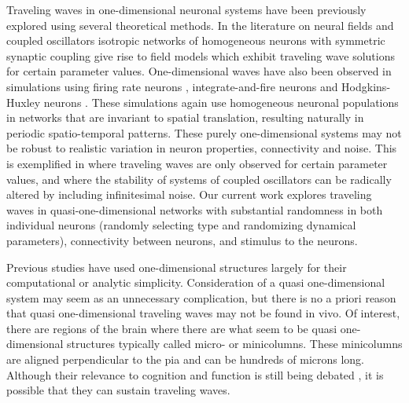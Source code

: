 \documentclass[12pt]{article}
\begin{document}
\color{red}
Traveling waves in one-dimensional neuronal systems have been previously explored using several theoretical methods.
In the literature on neural fields \parencite{Ermentrout1979}\parencite{Folias2012} and coupled oscillators \parencite{Kopell1986}\parencite{Williams1997} isotropic networks of homogeneous neurons with symmetric synaptic coupling give rise to field models which exhibit traveling wave solutions for certain parameter values. 
One-dimensional waves have also been observed in simulations using firing rate neurons \parencite{Senk2020}\parencite{Roxin2005}, integrate-and-fire neurons \parencite{Bressloff1997}\parencite{Golomb1999} and Hodgkins-Huxley neurons \parencite{Golomb1997}.
These simulations again use homogeneous neuronal populations in networks that are invariant to spatial translation, resulting naturally in periodic spatio-temporal patterns.
These purely one-dimensional systems may not be robust to realistic variation in neuron properties, connectivity and noise.
This is exemplified in \parencite{Senk2020} where traveling waves are only observed for certain parameter values, and \parencite{Strogatz1991} where the stability of systems of coupled oscillators can be radically altered by including infinitesimal noise.
Our current work explores traveling waves in quasi-one-dimensional networks with substantial randomness in both individual neurons (randomly selecting type and randomizing dynamical parameters), connectivity between neurons, and stimulus to the neurons.
\color{black}

\color{red}
Previous studies have used one-dimensional structures largely for their computational or analytic simplicity. Consideration of a quasi one-dimensional system may seem as an unnecessary complication, but there is no a priori reason that quasi one-dimensional traveling waves may not be found in vivo.
\color{black} 
Of interest, there are regions of the brain where there are what seem to be \color{red}quasi \color{black} one-dimensional structures \parencite{buxhoeveden2002}\parencite{mountcastle1997} typically called micro- or minicolumns. 
These minicolumns are aligned perpendicular to the pia and can be hundreds of microns long.  
Although their relevance to cognition and function is still being debated \parencite{horton2005}\parencite{Cruz2009}\parencite{DaCosta2010}\parencite{buxhoeveden2002}, it is possible that they can sustain traveling waves.
\end{document}
